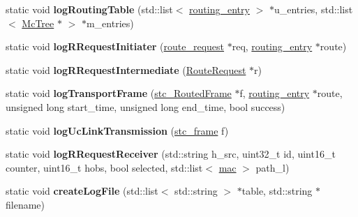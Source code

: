 \begin{DoxyCompactItemize}
\item 
\hypertarget{classLogging_a2a254e6ee56fdb1fc1f623a566690035}{static void {\bfseries log\-Routing\-Table} (std\-::list$<$ \hyperlink{structrouting__entry}{routing\-\_\-entry} $>$ $\ast$u\-\_\-entries, std\-::list$<$ \hyperlink{classMcTree}{Mc\-Tree} $\ast$ $>$ $\ast$m\-\_\-entries)}\label{classLogging_a2a254e6ee56fdb1fc1f623a566690035}

\item 
\hypertarget{classLogging_a91a975cd0f43e6931c90a48527483ca6}{static void {\bfseries log\-R\-Request\-Initiater} (\hyperlink{structroute__request}{route\-\_\-request} $\ast$req, \hyperlink{structrouting__entry}{routing\-\_\-entry} $\ast$route)}\label{classLogging_a91a975cd0f43e6931c90a48527483ca6}

\item 
\hypertarget{classLogging_a16ccd4cfea65e904d18778a26dae461d}{static void {\bfseries log\-R\-Request\-Intermediate} (\hyperlink{classRouteRequest}{Route\-Request} $\ast$r)}\label{classLogging_a16ccd4cfea65e904d18778a26dae461d}

\item 
\hypertarget{classLogging_ab454eb0a6873f20d9546d965e0581708}{static void {\bfseries log\-Transport\-Frame} (\hyperlink{structstc__RoutedFrame}{stc\-\_\-\-Routed\-Frame} $\ast$f, \hyperlink{structrouting__entry}{routing\-\_\-entry} $\ast$route, unsigned long start\-\_\-time, unsigned long end\-\_\-time, bool success)}\label{classLogging_ab454eb0a6873f20d9546d965e0581708}

\item 
\hypertarget{classLogging_a7eae9741c39ce916e7f9126b2e4bc097}{static void {\bfseries log\-Uc\-Link\-Transmission} (\hyperlink{structstc__frame}{stc\-\_\-frame} f)}\label{classLogging_a7eae9741c39ce916e7f9126b2e4bc097}

\item 
\hypertarget{classLogging_a906bcd09785f88836339d1c00a6544e5}{static void {\bfseries log\-R\-Request\-Receiver} (std\-::string h\-\_\-src, uint32\-\_\-t id, uint16\-\_\-t counter, uint16\-\_\-t hobs, bool selected, std\-::list$<$ \hyperlink{structmac}{mac} $>$ path\-\_\-l)}\label{classLogging_a906bcd09785f88836339d1c00a6544e5}

\item 
\hypertarget{classLogging_afe135237f47a6264a6cb1ec2648e88d5}{static void {\bfseries create\-Log\-File} (std\-::list$<$ std\-::string $>$ $\ast$table, std\-::string $\ast$filename)}\label{classLogging_afe135237f47a6264a6cb1ec2648e88d5}


\end{DoxyCompactItemize}
